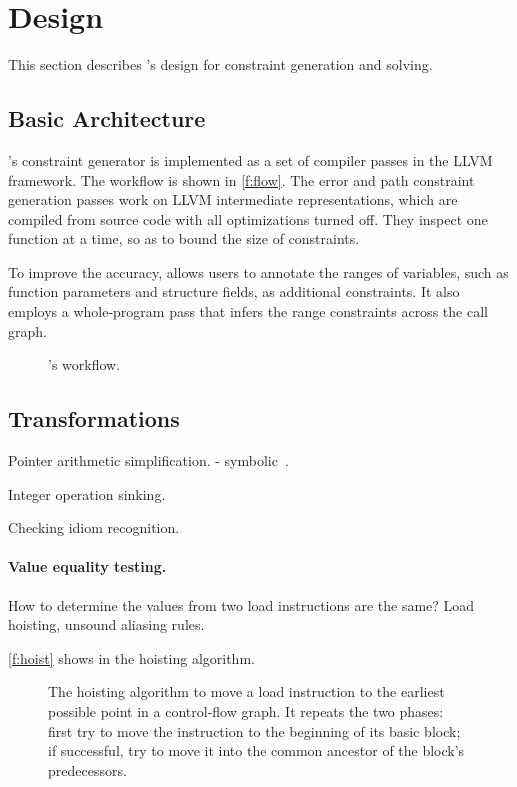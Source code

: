 \section{Design}
\label{s:gen}

This section describes \sys's design for constraint generation and
solving.

\subsection{Basic Architecture}

\sys's constraint generator is implemented as a set of compiler
passes in the LLVM~\cite{lattner:llvm} framework.  The workflow is
shown in \autoref{f:flow}.  The error and path constraint generation
passes work on LLVM intermediate representations, which are compiled
from source code with all optimizations turned off.  They inspect
one function at a time, so as to bound the size of constraints.

To improve the accuracy, \sys allows users to annotate the ranges
of variables, such as function parameters and structure fields, as
additional constraints. It also employs a whole-program pass that
infers the range constraints across the call graph.

\begin{figure}
\centering
\resizebox{0.9\linewidth}{!}{

}
\caption{\sys's workflow.}
\label{f:flow}
\end{figure}

\subsection{Transformations}

Pointer arithmetic simplification.
- symbolic~\cite{engelen:symbolic}.

Integer operation sinking.

Checking idiom recognition.

\paragraph{Value equality testing.}
How to determine the values from two load instructions
are the same? Load hoisting, unsound aliasing rules.

\autoref{f:hoist} shows in the hoisting algorithm.

\begin{figure}

\caption{The hoisting algorithm to move a load instruction to the
earliest possible point in a control-flow graph.  It repeats the
two phases: first try to move the instruction to the beginning of
its basic block; if successful, try to move it into the common
ancestor of the block's predecessors.}
\label{f:hoist}
\end{figure}

